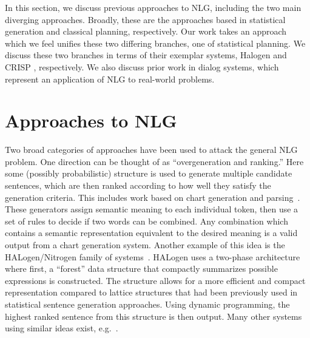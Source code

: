 In this section, we discuss previous approaches to NLG, including
the two main diverging approaches.  Broadly, these are the
approaches based in statistical generation and classical planning,
respectively.  Our work takes an approach which we feel unifies
these two differing branches, one of statistical planning.
We discuss these two branches in terms of their
exemplar systems, Halogen \cite{langkilde_2002_halogen}
and CRISP \cite{koller_sentence_2007}, respectively.
We also discuss prior work in dialog systems,
which represent an application of NLG to
real-world problems.

\section{Approaches to NLG}
Two broad categories of
approaches have been used to attack the general NLG problem. One
direction can be thought of as ``overgeneration and ranking.'' Here
some (possibly probabilistic) structure is used to generate multiple
candidate sentences, which are then ranked according to how well they
satisfy the generation criteria. This includes work based on chart
generation and
parsing~\cite{shieber_uniform_1988,kay_chart_1996}. These generators
assign semantic meaning to each individual token, then use a set of
rules to decide if two words can be combined.  Any combination which
contains a semantic representation equivalent to the desired meaning 
is a valid output from a chart generation
system. Another example of this idea is the HALogen/Nitrogen
family of systems~\cite{langkilde_2002_halogen}. HALogen uses a two-phase
architecture where first, a ``forest'' data structure that compactly
summarizes possible expressions is constructed.  The structure allows
for a more efficient and compact representation compared to lattice
structures that had been previously used in statistical sentence
generation approaches.  Using dynamic programming, the highest ranked
sentence from this structure is then output. Many other systems using
similar ideas exist, e.g.~\cite{white_2003_ccg,lu2009natural}.

